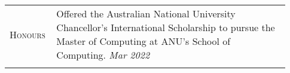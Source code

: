 \documentclass[letterpaper, 10pt, oneside]{article}
\newcommand{\stitle}[1]{\normalsize{\textsc{#1}}}
\begin{document}
\begin{longtable}{@{} p{0.13\linewidth} p{0.8\linewidth}}




    \stitle{Honours}
                                                      & Offered the Australian National University Chancellor's International Scholarship to pursue the Master of Computing at ANU's School of Computing.
    \hfill \textsl{Mar 2022}                                                                                                                                                                                                                                  \\
    \\[-1ex]


\end{longtable}
\end{document}
